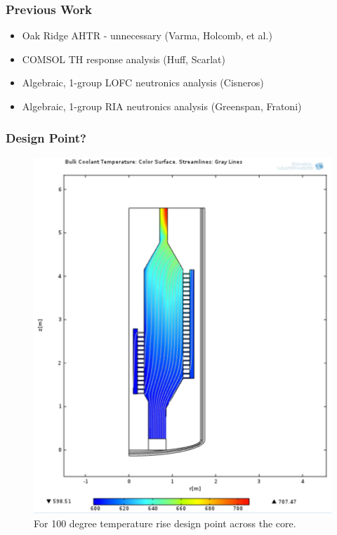 \begin{frame}[fragile]
  \frametitle{Previous Work}
  \begin{itemize}
    \item Oak Ridge AHTR - unnecessary (Varma, Holcomb, et al.)
    \item COMSOL TH response analysis (Huff, Scarlat)
    \item Algebraic, 1-group LOFC neutronics analysis (Cisneros)
    \item Algebraic, 1-group RIA neutronics analysis (Greenspan, Fratoni)
  \end{itemize}

\end{frame}

\begin{frame}[fragile]
  \frametitle{Design Point?}
  \begin{figure}[htbp!]
    \begin{center}
      \includegraphics[height=0.8\textheight]{./priorart/coolant_temps_100_deg_rise.eps}
    \end{center}
    \caption{For 100 degree temperature rise design point across the core.}
    \label{fig:200degrise}
  \end{figure}
\end{frame}

